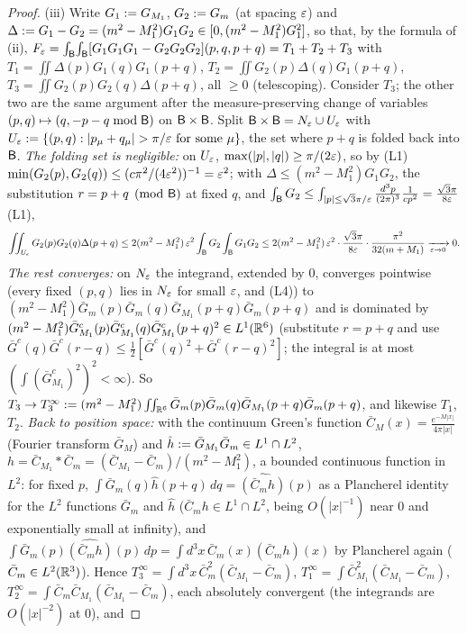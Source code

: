 \begin{proof}
(iii) Write $G_1:= G_{M_1}$, $G_2:= G_m$ (at spacing $\varepsilon$) and $\Delta:= G_1-G_2=(m^2-M_1^2)G_1G_2\in[0,(m^2-M_1^2)G_1^2]$, so that, by the formula of (ii), $F_{\varepsilon}=\int_{\mathsf B}\!\int_{\mathsf B}[G_1G_1G_1-G_2G_2G_2](p,q,p+q)=T_1+T_2+T_3$ with $T_1=\iint\Delta(p)G_1(q)G_1(p+q)$, $T_2=\iint G_2(p)\Delta(q)G_1(p+q)$, $T_3=\iint G_2(p)G_2(q)\Delta(p+q)$, all $\ge0$ (telescoping). Consider $T_3$; the other two are the same argument after the measure-preserving change of variables $(p,q)\mapsto(q,-p-q\bmod\mathsf B)$ on $\mathsf B\times\mathsf B$. Split $\mathsf B\times\mathsf B=N_{\varepsilon}\cup U_{\varepsilon}$ with $U_\eps\defeq\{(p,q):|p_\mu+q_\mu|>\pi/\eps\text{ for some }\mu\}$, the set where $p+q$ is folded back into $\mathsf B$. \emph{The folding set is negligible:} on $U_{\varepsilon}$, $\max(|p|,|q|)\ge\pi/(2\varepsilon)$, so by (L1) $\min(G_2(p),G_2(q))\le(c\pi^2/(4\varepsilon^2))^{-1}=\varepsilon^2$; with $\Delta\le(m^2-M_1^2)G_1G_2$, the substitution $r=p+q\pmod{\mathsf B}$ at fixed $q$, and $\int_{\mathsf B} G_2\le\int_{|p|\le\sqrt3\pi/\varepsilon}\frac{d^3p}{(2\pi)^3}\frac1{cp^2}=\frac{\sqrt3\pi}{8\varepsilon}$ (L1),
\[
\iint_{U_{\varepsilon}}G_2(p)G_2(q)\Delta(p+q)\le2(m^2-M_1^2)\,\varepsilon^2\int_{\mathsf B} G_2\int_{\mathsf B} G_1G_2\le2(m^2-M_1^2)\,\varepsilon^2\cdot\frac{\sqrt3\pi}{8\varepsilon}\cdot\frac{\pi^2}{32(m+M_1)}\xrightarrow[\varepsilon\to0]{}0 .
\]
\emph{The rest converges:} on $N_{\varepsilon}$ the integrand, extended by $0$, converges pointwise (every fixed $(p,q)$ lies in $N_{\varepsilon}$ for small $\varepsilon$, and (L4)) to $(m^2-M_1^2)\bar G_m(p)\bar G_m(q)\bar G_{M_1}(p+q)\bar G_m(p+q)$ and is dominated by $(m^2-M_1^2)\bar G^c_{M_1}(p)\bar G^c_{M_1}(q)\bar G^c_{M_1}(p+q)^2\in L^1(\mathbb R^6)$ (substitute $r=p+q$ and use $\bar G^c(q)\bar G^c(r-q)\le\frac12[\bar G^c(q)^2+\bar G^c(r-q)^2]$; the integral is at most $(\int(\bar G^c_{M_1})^2)^2<\infty$). So $T_3\to T_3^\infty:=(m^2-M_1^2)\iint_{\mathbb R^6}\bar G_m(p)\bar G_m(q)\bar G_{M_1}(p+q)\bar G_m(p+q)$, and likewise $T_1$, $T_2$. \emph{Back to position space:} with the continuum Green's function $\bar C_M(x)=\frac{e^{-M|x|}}{4\pi|x|}$ (Fourier transform $\bar G_M$) and $\hat h:=\bar G_{M_1}\bar G_m\in L^1\cap L^2$, $h=\bar C_{M_1}*\bar C_m=(\bar C_{M_1}-\bar C_m)/(m^2-M_1^2)$, a bounded continuous function in $L^2$: for fixed $p$, $\int\bar G_m(q)\hat h(p+q)\,dq=\widehat{(\bar C_mh)}(p)$ as a Plancherel identity for the $L^2$ functions $\bar G_m$ and $\hat h$ ($\bar C_mh\in L^1\cap L^2$, being $O(|x|^{-1})$ near $0$ and exponentially small at infinity), and $\int\bar G_m(p)\widehat{(\bar C_mh)}(p)\,dp=\int d^3x\,\bar C_m(x)(\bar C_mh)(x)$ by Plancherel again ($\bar C_m\in L^2(\mathbb R^3)$). Hence $T_3^\infty=\int d^3x\,\bar C_m^2(\bar C_{M_1}-\bar C_m)$, $T_1^\infty=\int\bar C_{M_1}^2(\bar C_{M_1}-\bar C_m)$, $T_2^\infty=\int\bar C_m\bar C_{M_1}(\bar C_{M_1}-\bar C_m)$, each absolutely convergent (the integrands are $O(|x|^{-2})$ at $0$), and

\end{proof}
